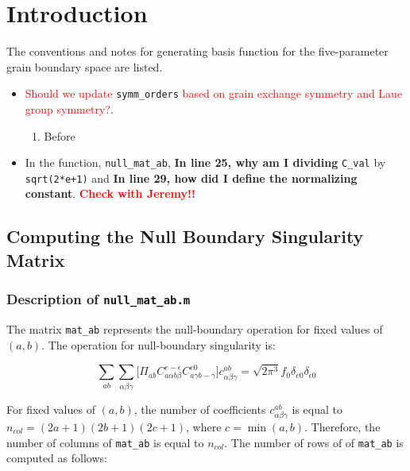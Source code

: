 \section{Introduction}


The conventions and notes for generating basis function for the five-parameter
grain boundary space are listed.

\begin{itemize}
\item \textcolor{red}{Should we update} \verb|symm_orders| \textcolor{red}{based
    on grain exchange symmetry and Laue group symmetry?}.
  \begin{enumerate}
  \item Before
  \end{enumerate}
\item In the function, \verb|null_mat_ab|, \textbf{In line 25, why am I
    dividing} \verb|C_val| by \verb|sqrt(2*e+1)| and \textbf{In line 29, how did
    I define the normalizing constant}. \textcolor{red}{\textbf{Check with
      Jeremy!!}}
\end{itemize}

\clearpage
\newpage

\subsection{Computing the Null Boundary Singularity Matrix}


% 

\subsubsection{Description of \texttt{null\_mat\_ab.m}}

The matrix \verb|mat_ab| represents the null-boundary operation for fixed values
of $(a,b)$. The operation for null-boundary singularity is:

\begin{equation*}
\sum_{a b} \sum_{\alpha \beta \gamma} \bigg[ \Pi_{a b} C^{e -\epsilon}_{a \alpha b \beta} C^{e 0}_{a \gamma b -\gamma} \bigg] c^{a b}_{\alpha \beta \gamma} = \sqrt{2 \pi^3} f_0 \delta_{e 0} \delta_{\epsilon 0}
\end{equation*}

For fixed values of $(a,b)$, the number of coefficients $c^{a b}_{\alpha \beta
  \gamma}$ is equal to $n_{col} = (2a+1)(2b+1)(2c+1)$, where $c = \min (a,b)$.
Therefore, the number of columns of \verb|mat_ab| is equal to $n_{col}$. The
number of rows of of \verb|mat_ab| is computed as follows:

